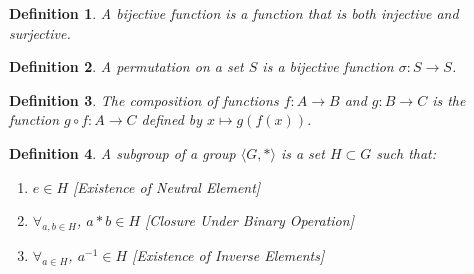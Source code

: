 \documentclass[oneside]{book}
\theoremstyle{mystyle}
\newtheorem{definition}{Definition}[section]
\begin{document}
\begin{definition}
A bijective function is a function that is both injective and surjective.
\end{definition}
\begin{definition}
A permutation on a set $S$ is a bijective function $\sigma:S\rightarrow S$.
\end{definition}
\begin{definition}
The composition of functions $f:A\rightarrow B$ and $g:B\rightarrow C$ is the function $g\circ f:A\rightarrow C$ defined by $x\mapsto g(f(x))$.
\end{definition}
\begin{definition}
A subgroup of a group $\langle G,*\rangle$ is a set $H\subset G$ such that:
\begin{enumerate}
    \item $e\in H$ \hfill [Existence of Neutral Element]
    \item $\forall_{a,b\in H}$, $a*b \in H$ \hfill [Closure Under Binary Operation]
    \item $\forall_{a\in H}$, $a^{-1}\in H$ \hfill [Existence of Inverse Elements]
\end{enumerate}
\end{definition}
\end{document}
